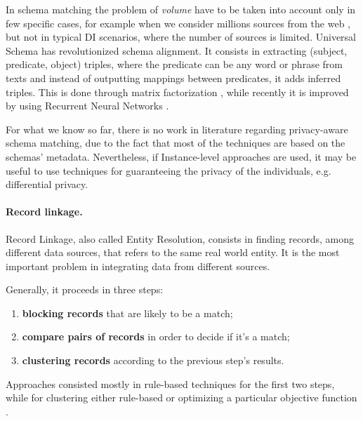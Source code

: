 \documentclass[12pt]{article}
\begin{document}
In schema matching the problem of \textit{volume} have to be taken into account only in few specific cases, for example when we consider millions sources from the web \cite*{Pimplikar2012}, but not in typical DI scenarios, 
where the number of sources is limited.
Universal Schema \cite*{Riedel2013} has revolutionized schema alignment. It consists in extracting (subject, predicate, object) triples, where the predicate can be any word or phrase from texts and instead of outputting 
mappings between predicates, it adds inferred triples. This is done through matrix factorization \cite*{Riedel2013}, while recently it is improved by using 
Recurrent Neural Networks \cite*{Das2016,Nee2015}.

For what we know so far, there is no work in literature regarding privacy-aware schema matching, due to the fact that most of the techniques are based on the schemas' metadata. 
Nevertheless, if Instance-level approaches are used, it may be useful to use techniques for guaranteeing the privacy of the individuals, e.g. differential privacy.




\paragraph{Record linkage.}
Record Linkage, also called Entity Resolution, consists in finding records, among different data sources, that refers to the same real world entity. 
It is the most important problem in integrating data from different sources. 

Generally, it proceeds in three steps: 
\begin{enumerate}
   \item \textbf{blocking records} that are likely to be a match;
   \item \textbf{compare pairs of records} in order to decide if it's a match;
   \item \textbf{clustering records} according to the previous step's results.
\end{enumerate}

Approaches consisted mostly in rule-based techniques \cite*{recordLinkTheory, Gal2011} for the first two steps, while for clustering either 
rule-based or optimizing a particular objective function \cite*{Hass2009}. 
\end{document}
